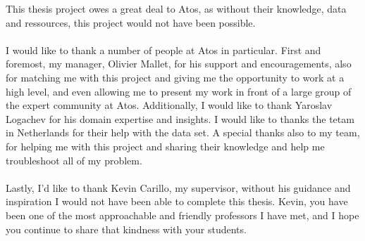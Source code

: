 \begin{acknowledgments}
This thesis project owes a great deal to Atos, as without their knowledge, data and ressources, this project would not have been possible. \\
\\
I would like to thank a number of people at Atos in particular. First and foremost, my manager, Olivier Mallet, for his support and encouragements, also for matching me with this project and giving me the opportunity to work at a high level, and even allowing me to present my work in front of a large group of the expert community at Atos. Additionally, I would like to thank Yaroslav Logachev for his domain expertise and insights. I would like to thanks the tetam in Netherlands for their help with the data set. A special thanks also to my team, for helping me with this project and sharing their knowledge and help me troubleshoot all of my problem.\\
\\
Lastly, I’d like to thank Kevin Carillo, my supervisor, without his guidance and inspiration I would not have been able to complete this thesis. Kevin, you have been one of the most approachable and friendly professors I have met, and I hope you continue to share that kindness with your students.
\end{acknowledgments}